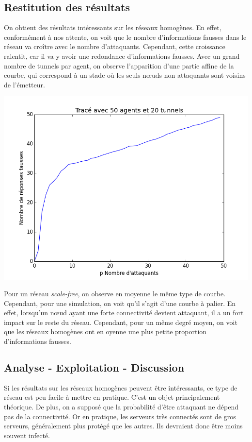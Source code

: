 \documentclass[11pt,a4paper]{article}
\begin{document}
	
\subsection{Restitution des résultats}
	On obtient des résultats intéressants sur les réseaux homogènes. En effet, conformément à nos attente, on voit que le nombre d'informations fausses dans le réseau va croître avec le nombre d'attaquants. Cependant, cette croissance ralentit, car il va y avoir une redondance d'informations fausses. Avec un grand nombre de tunnels par agent, on observe l'apparition d'une partie affine de la courbe, qui correspond à un stade où les seuls nœuds non attaquants sont voisins de l'émetteur.
	
\includegraphics[scale=0.3]{../resultats/atkaleat/atkaleat-50-20-1.png} 
	
	Pour un réseau \emph{scale-free}, on observe en moyenne le même type de courbe. Cependant, pour une simulation, on voit qu'il s'agit d'une courbe à palier. En effet, lorsqu'un nœud ayant une forte connectivité devient attaquant, il a un fort impact sur le reste du réseau.
	Cependant, pour un même degré moyen, on voit que les réseaux homogènes ont en oyenne une plus petite proportion d'informations fausses. 


\subsection{Analyse - Exploitation - Discussion}
	Si les résultats sur les réseaux homogènes peuvent être intéressants, ce type de réseau est peu facile à mettre en pratique. C'est un objet principalement théorique. De plus, on a supposé que la probabilité d'être attaquant ne dépend pas de la connectivité. Or en pratique, les serveurs très connectés sont de gros serveurs, généralement plus protégé que les autres. Ils devraient donc être moins souvent infecté.
\end{document}
